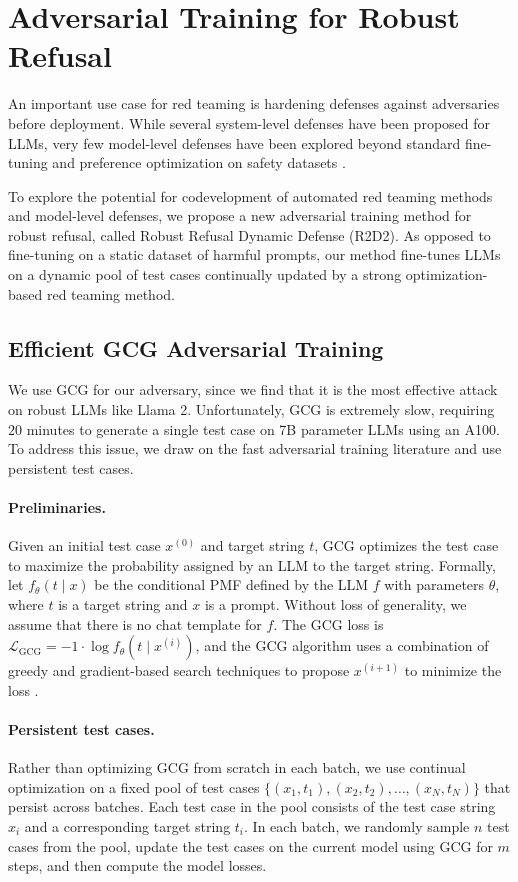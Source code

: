 
\section{Adversarial Training for Robust Refusal}\label{sec:adv_training}
An important use case for red teaming is hardening defenses against adversaries before deployment. While several system-level defenses have been proposed for LLMs, very few model-level defenses have been explored beyond standard fine-tuning and preference optimization on safety datasets \citep{ganguli2022red, achiam2023gpt, touvron2023llama}.

To explore the potential for codevelopment of automated red teaming methods and model-level defenses, we propose a new adversarial training method for robust refusal, called Robust Refusal Dynamic Defense (R2D2). As opposed to fine-tuning on a static dataset of harmful prompts, our method fine-tunes LLMs on a dynamic pool of test cases continually updated by a strong optimization-based red teaming method.



\subsection{Efficient GCG Adversarial Training}
We use GCG for our adversary, since we find that it is the most effective attack on robust LLMs like Llama 2. Unfortunately, GCG is extremely slow, requiring $20$ minutes to generate a single test case on 7B parameter LLMs using an A100. To address this issue, we draw on the fast adversarial training literature \citep{shafahi2019adversarial} and use persistent test cases.


\paragraph{Preliminaries.}
Given an initial test case $x^{(0)}$ and target string $t$, GCG optimizes the test case to maximize the probability assigned by an LLM to the target string. Formally, let $f_\theta(t \mid x)$ be the conditional PMF defined by the LLM $f$ with parameters $\theta$, where $t$ is a target string and $x$ is a prompt. Without loss of generality, we assume that there is no chat template for $f$. The GCG loss is $\mathcal{L}_\text{GCG} = -1 \cdot \log f_\theta(t \mid x^{(i)})$, and the GCG algorithm uses a combination of greedy and gradient-based search techniques to propose $x^{(i+1)}$ to minimize the loss \citep{zou2023universal}.

\paragraph{Persistent test cases.}
Rather than optimizing GCG from scratch in each batch, we use continual optimization on a fixed pool of test cases $\{(x_1, t_1), (x_2, t_2), \dotsc, (x_N, t_N)\}$ that persist across batches. Each test case in the pool consists of the test case string $x_i$ and a corresponding target string $t_i$. In each batch, we randomly sample $n$ test cases from the pool, update the test cases on the current model using GCG for $m$ steps, and then compute the model losses.

